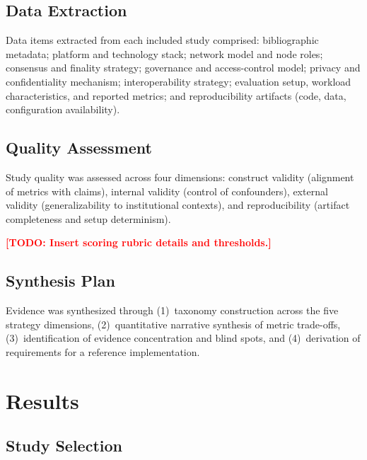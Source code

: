 \documentclass[journal]{IEEEtran}
\newcommand{\todo}[1]{\textcolor{red}{\textbf{[TODO: #1]}}}
\begin{document}
\subsection{Data Extraction}

Data items extracted from each included study comprised: bibliographic metadata; platform and technology stack; network model and node roles; consensus and finality strategy; governance and access-control model; privacy and confidentiality mechanism; interoperability strategy; evaluation setup, workload characteristics, and reported metrics; and reproducibility artifacts (code, data, configuration availability).

\subsection{Quality Assessment}

Study quality was assessed across four dimensions: construct validity (alignment of metrics with claims), internal validity (control of confounders), external validity (generalizability to institutional contexts), and reproducibility (artifact completeness and setup determinism).

\todo{Insert scoring rubric details and thresholds.}

\subsection{Synthesis Plan}

Evidence was synthesized through (1)~taxonomy construction across the five strategy dimensions, (2)~quantitative narrative synthesis of metric trade-offs, (3)~identification of evidence concentration and blind spots, and (4)~derivation of requirements for a reference implementation.

\section{Results}
\label{sec:results}

\subsection{Study Selection}
\end{document}
